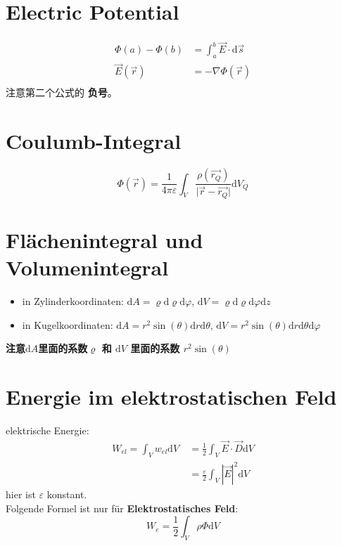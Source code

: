 \documentclass[nochapterpage,bigchapter,linedtoc,longdoc,colorback,accentcolor=tud2c]{tudreport}
\begin{document}
\section{Electric Potential}
\begin{equation*}
	\begin{aligned}
		\Phi(a) - \Phi(b) &= \int_{a}^{b} \vec{E} \cdot \mathrm{d}\vec{s} \\
		\vec{E}(\vec{r}) &= -\nabla\Phi(\vec{r})\\
	\end{aligned}
\end{equation*}
注意第二个公式的 \textbf{负号}。
\section{Coulumb-Integral}
\begin{equation*}
	\Phi(\vec{r}) = \frac{1}{4\pi \varepsilon} \int_{V} \frac{ \rho( \vec{r_Q})}{\big|\vec{r} -\vec{r_Q}\big|}\mathrm{d} V_{Q}
\end{equation*}
\section{Flächenintegral und Volumenintegral}
\begin{itemize}
	\item in Zylinderkoordinaten:  $\mathrm{d}A = \varrho \mathrm{d}\varrho \mathrm{d}\varphi$, $\mathrm{d}V = \varrho \mathrm{d} \varrho \mathrm{d}\varphi \mathrm{d}z$
	\item in Kugelkoordinaten: $\mathrm{d}A = r^2\sin(\theta)\mathrm{d}r\mathrm{d}\theta$, $\mathrm{d}V = r^2 \sin(\theta) \mathrm{d}r\mathrm{d}\theta \mathrm{d}\varphi$
\end{itemize}
\textbf{注意$\mathrm{d}A$里面的系数$\varrho$ 和 $\mathrm{d}V$ 里面的系数 $r^2 \sin(\theta)$}
\section{Energie im elektrostatischen Feld}
elektrische Energie:
\begin{equation*}
	\begin{aligned}
		W_{el} = \int_V w_{el}\mathrm{d}V \ &= \frac{1}{2} \int_V \vec{E}\cdot \vec{D}\mathrm{d}V\\
   &= \frac{\varepsilon}{2} \int_V |\vec{E}|^2 \mathrm{d}V
	\end{aligned}
\end{equation*}
hier ist $\varepsilon$ konstant.\\
Folgende Formel ist nur für \textbf{Elektrostatisches Feld}:
\begin{equation*}
		W_e = \frac{1}{2} \int_V \rho \Phi \mathrm{d}V
\end{equation*}
\end{document}
